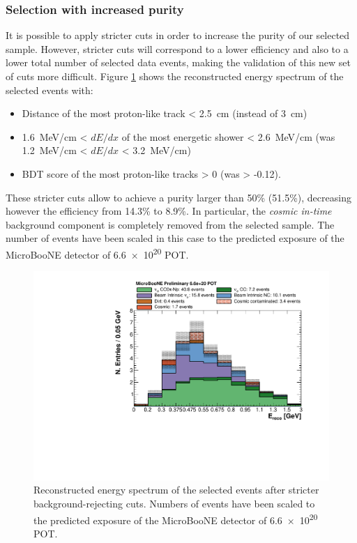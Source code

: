 \subsubsection{Selection with increased purity}
It is possible to apply stricter cuts in order to increase the purity of our selected sample. However, stricter cuts will correspond to a lower efficiency and also to a lower total number of selected data events, making the validation of this new set of cuts more difficult.
Figure \ref{fig:hardcuts} shows the reconstructed energy spectrum of the selected events with:
\begin{itemize}
\item Distance of the most proton-like track < 2.5~cm (instead of 3~cm)
\item 1.6~MeV/cm < $dE/dx$ of the most energetic shower < 2.6~MeV/cm (was 1.2~MeV/cm < $dE/dx$ < 3.2~MeV/cm)
\item BDT score of the most proton-like tracks > 0 (was > -0.12).
\end{itemize}
These stricter cuts allow to achieve a purity larger than 50\% (51.5\%), decreasing however the efficiency from 14.3\% to 8.9\%. In particular, the \emph{cosmic in-time} background component is completely removed from the selected sample.
The number of events have been scaled in this case to the predicted exposure of the MicroBooNE detector of \num{6.6e20} POT. 

\begin{figure}[htbp]
\centering
  \includegraphics[width=0.65\linewidth]{figures/hardcuts.pdf}
  \caption{Reconstructed energy spectrum of the selected events after stricter background-rejecting cuts. Numbers of events have been scaled to the predicted exposure of the MicroBooNE detector of \num{6.6e20} POT. }
  \label{fig:hardcuts}
\end{figure}